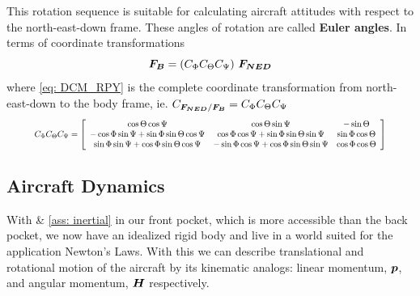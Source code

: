 \documentclass[12pt]{ucthesis}
\begin{document}
%
This rotation sequence is suitable for calculating aircraft attitudes with respect to the north-east-down frame. These angles of rotation are called \textbf{Euler angles}. In terms of coordinate transformations
%
	\begin{equation}
		\boldsymbol{F_{B}} = \left( C_{\Phi}C_{\Theta}C_{\Psi} \right) \, \boldsymbol{F_{NED}}
		\label{eq: DCM_NED_2_ABC}
	\end{equation}
%
where \autoref{eq: DCM_RPY} is the complete coordinate transformation from north-east-down to the body frame, ie. $C_{\boldsymbol{F_{NED}} / \boldsymbol{F_{B}}} = C_{\Phi}C_{\Theta}C_{\Psi} $
%
	\begin{equation}
		\resizebox{.9\hsize}{!}{$
		C_{\Phi}C_{\Theta}C_{\Psi} = \left[ \begin{array}{ccc}
		\cos\Theta \cos\Psi &  \cos\Theta \sin\Psi & -\sin\Theta  \\
		-\cos\Phi \sin\Psi  + \sin\Phi \sin\Theta \cos\Psi & \cos\Phi \cos\Psi + \sin\Phi \sin\Theta \sin\Psi &  \sin\Phi \cos\Theta  \\
		\sin\Phi \sin\Psi + \cos\Phi \sin\Theta \cos\Psi & -\sin\Phi \cos\Psi + \cos\Phi \sin\Theta \sin\Psi & \cos\Phi \cos\Theta \\
		\end{array} \right] $}
		\label{eq: DCM_RPY}
	\end{equation}

\subsection{Aircraft Dynamics}
\label{subsec: ac_dynamics}
%
With  \& \ref{ass: inertial} in our front pocket, which is more accessible than the back pocket, we now have an idealized rigid body and live in a world suited for the application Newton's Laws. With this we can describe translational and rotational motion of the aircraft by its kinematic analogs: linear momentum, $\boldsymbol{p}$, and angular momentum, $\boldsymbol{H}$ respectively.
\end{document}
